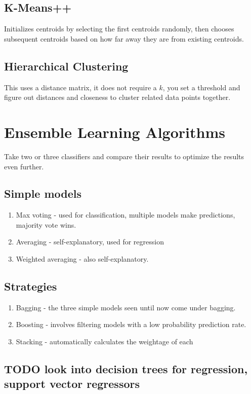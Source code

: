 \documentclass[11pt]{article}
\begin{document}
\subsection{K-Means++}
\label{sec:org266321a}
Initializes centroids by selecting the first centroids randomly, then chooses subsequent centroids based on how far away they are from existing centroids.
\subsection{Hierarchical Clustering}
\label{sec:orgc1c698c}
This uses a distance matrix, it does not require a \(k\), you set a threshold and figure out distances and closeness to cluster related data points together.
\section{Ensemble Learning Algorithms}
\label{sec:orgbca856a}
Take two or three classifiers and compare their results to optimize the results even further.
\subsection{Simple models}
\label{sec:orgd87a149}
\begin{enumerate}
\item Max voting - used for classification, multiple models make predictions, majority vote wins.
\item Averaging - self-explanatory, used for regression
\item Weighted averaging - also self-explanatory.
\end{enumerate}
\subsection{Strategies}
\label{sec:orge2dfe2c}
\begin{enumerate}
\item Bagging - the three simple models seen until now come under bagging.
\item Boosting - involves filtering models with a low probability prediction rate.
\item Stacking - automatically calculates the weightage of each
\end{enumerate}
\subsection{{\bfseries\sffamily TODO} look into decision trees for regression, support vector regressors}
\label{sec:orgdef03b0}
\end{document}
